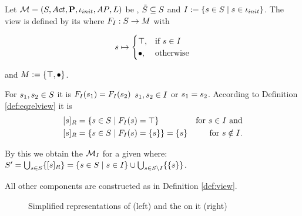 \documentclass[preview]{standalone}
\begin{document}
\begin{definition}
	Let ${{{\mathcal{M}}}} = {{({S}, {Act}, {\textbf{P}}, {\iota_{init}}, {AP}, {L})}}$ be \achgphN, ${\tilde{{S}}} \subseteq {S}$ and ${I} := \{{s} \in {S} \mid {s} \in {\ensuremath{{\iota_{init}}}}\}$. The view \viewinitstates is defined by its \grpfctN where ${{F_{{{I}}}}} : {S} \to {\ensuremath{{M}}}$ with 
	
	\[
	{s} \mapsto
	\begin{cases}
			{\top},				& \text{if } {s} \in {I} \\
			{\bullet},          	& \text{otherwise}
		\end{cases}
	\]
	
	and ${{M}} := {\{{\top}, {\bullet}\}}$.
\end{definition}

For ${s}_1,{s}_2 \in {S}$ it is ${{F_{{{I}}}}}({s}_1) = {{F_{{{I}}}}}({s}_2)$ \iffN ${s}_1, {s}_2 \in {I}$ or ${s}_1 = {s}_2$. According to Definition \ref{def:eqrelview} it is 
\begin{align*}
	{\ensuremath{{[{s}]_{{R}}}}} &= \{{s} \in {S} \mid {\ensuremath{{F_{{{I}}}}}}({s}) = {\top}\} &\text{for } {s} \in {I} \text{ and} \\
	{{[{s}]_{{R}}}} &= \{{s} \in {S} \mid {\ensuremath{{F_{{{I}}}}}}({s}) = \{{s}\} \} = \{{s}\} &\text{for } {s} \notin {I}.
\end{align*}


By this we obtain the \viewN ${{{{{\mathcal{M}}}}_{{{I}}}}}$ for a given \achgphN \chgph where: ${S}' = \bigcup_{{s} \in {S}} \{{{[{s}]_{{R}}}}\} = \{{s} \in {S} \mid {s} \in {I}\}\cup \bigcup_{{s} \in {S} \setminus {I}}\{\{{s}\}\}$.

All other components are constructed as in Definition \ref{def:view}.

\begin{figure}[h]
	\begin{minipage}{.5\textwidth}
		\hspace{5mm}
		
	\end{minipage}%
	\begin{minipage}{.5\textwidth}
		
	\end{minipage}
	\caption{Simplified representations of \mdp (left) and the \viewN \viewinitstates on it (right)}
	\label{fig:initStatesExmp}  
\end{figure}
\end{document}
